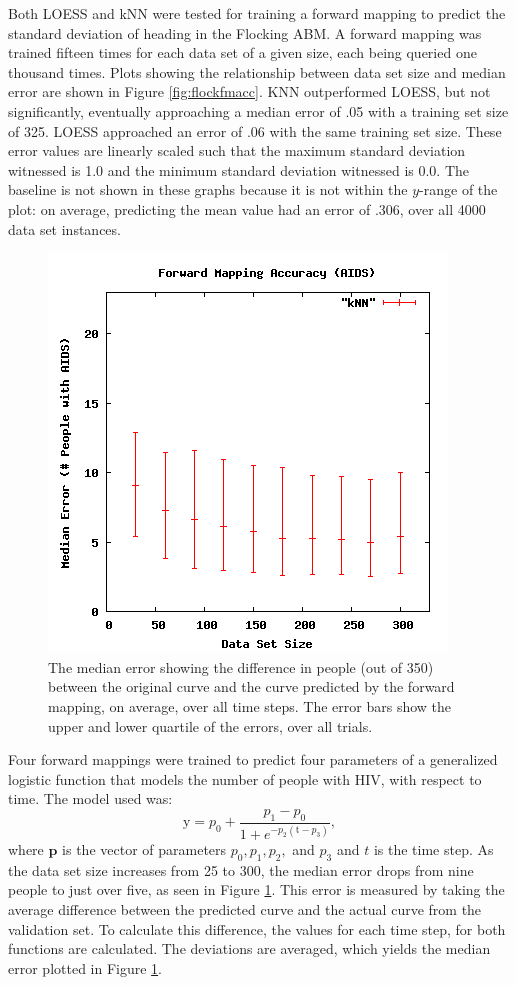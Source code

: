 Both LOESS and kNN were tested for training a forward mapping to predict the standard deviation of heading in the Flocking ABM.
A forward mapping was trained fifteen times for each data set of a given size, each being queried one thousand times.
Plots showing the relationship between data set size and median error are shown in Figure \ref{fig:flockfmacc}. 
KNN outperformed LOESS, but not significantly, eventually approaching a median error of .05 with a training set size of 325.
LOESS approached an error of .06 with the same training set size.
These error values are linearly scaled such that the maximum standard deviation witnessed is 1.0 and the minimum standard deviation witnessed is 0.0.
The baseline is not shown in these graphs because it is not within the $y$-range of the plot: on average, predicting the mean value had an error of .306, over all 4000 data set instances.


\begin{figure}[ht]
\centering
\includegraphics[scale=.5]{images/results_aids/aids-fmacc.png}
\caption{The median error showing the difference in people  (out of 350) between the original curve and the curve predicted by the forward mapping, on average, over all time steps.
The error bars show the upper and lower quartile of the errors, over all trials.}
\label{fig:aidsfmacc}
\end{figure}

Four forward mappings were trained to predict four parameters of a generalized logistic function that models the number of people with HIV, with respect to time.
The model used was:
\[ \mathrm{y} = p_0 + \displaystyle \frac{p_1 - p_0}{1 + e ^ {-p_2  (\mathrm{t} - p_3) } }, \]
where $\mathbf p$ is the vector of parameters $p_0, p_1, p_2,$ and $p_3$ and $t$ is the time step.
As the data set size increases from 25 to 300, the median error drops from nine people to just over five, as seen in Figure \ref{fig:aidsfmacc}.
This error is measured by taking the average difference between the predicted curve and the actual curve from the validation set.
To calculate this difference, the values for each time step, for both functions are calculated.
The deviations are averaged, which yields the median error plotted in Figure \ref{fig:aidsfmacc}.

